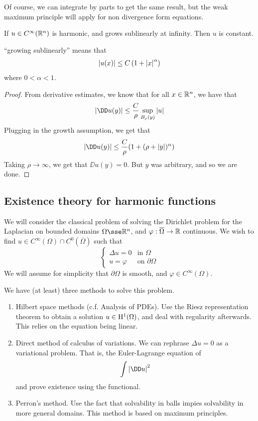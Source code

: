 \documentclass{article}
\begin{document}
\begin{remark}
    Of course, we can integrate by parts to get the same result, but the weak maximum principle will apply for non divergence form equations.
\end{remark}

\lec

\begin{theorem}
    [Liouville] If \(u \in C^\infty(\mathbb{R}^n)\) is harmonic, and grows sublinearly at infinity. Then \(u\) is constant.
\end{theorem}

\begin{remark}
    ``growing sublinearly'' means that
    \[\abs{u(x)} \le C\left(1 + \abs{x}^\alpha\right)\]
    where \(0 < \alpha < 1\).
\end{remark}

\begin{proof}
    From derivative estimates, we know that for all \(x \in \mathbb{R}^n\), we have that
    \[\abs{\DD u(y)} \le \frac{C}{\rho}\sup_{B_\rho(y)}\abs{u}\]
    Plugging in the growth assumption, we get that
    \[\abs{\DD u(y)} \le \frac{C}{\rho}(1 + (\rho + \abs{y})^\alpha)\]
    Taking \(\rho \to \infty\), we get that \(\DD u(y) = 0\). But \(y\) was arbitrary, and so we are done.
\end{proof}

\subsection{Existence theory for harmonic functions}

We will consider the classical problem of solving the Dirichlet problem for the Laplacian on bounded domains \(\Omega \sse \R^n\), and \(\varphi : \overline\Omega \to \mathbb{R}\) continuous. We wish to find \(u \in C^\infty(\Omega) \cap C^0(\overline\Omega)\) such that
\[\begin{cases}
    \Delta u = 0 & \text{in }\Omega \\
    u = \varphi & \text{on }\partial\Omega
\end{cases}\]
We will assume for simplicity that \(\partial\Omega\) is smooth, and \(\varphi \in C^\infty(\Omega)\).

We have (at least) three methods to solve this problem.
\begin{enumerate}
    \item Hilbert space methods (c.f. Analysis of PDEs). Use the Riesz representation theorem to obtain a solution \(u \in \mathrm{H}^1(\Omega)\), and deal with regularity afterwards. This relies on the equation being linear.
    \item Direct method of calculus of variations. We can rephrase \(\Delta u = 0\) as a variational problem. That is, the Euler-Lagrange equation of
    \[\int\abs{\DD u}^2\]
    and prove existence using the functional.
    \item Perron's method. Use the fact that solvability in balls impies solvability in more general domains. This method is based on maximum principles.
\end{enumerate}
\end{document}
